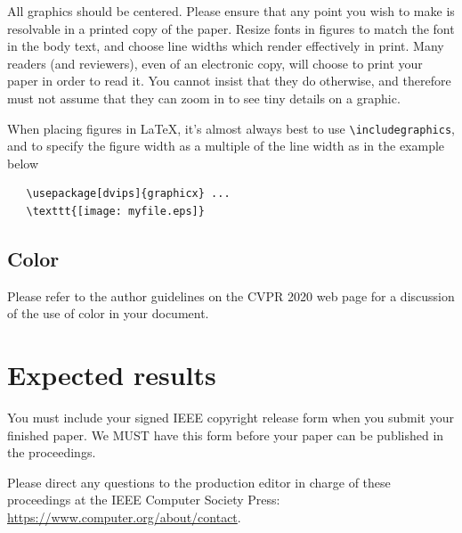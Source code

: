 \documentclass[10pt,twocolumn,letterpaper]{article}
\begin{document}
\begin{CJK}{UTF8}{bkai}
   All graphics should be centered.  Please ensure that any point you wish to
   make is resolvable in a printed copy of the paper.  Resize fonts in figures
   to match the font in the body text, and choose line widths which render
   effectively in print.  Many readers (and reviewers), even of an electronic
   copy, will choose to print your paper in order to read it.  You cannot
   insist that they do otherwise, and therefore must not assume that they can
   zoom in to see tiny details on a graphic.

   When placing figures in \LaTeX, it's almost always best to use
   \verb+\includegraphics+, and to specify the  figure width as a multiple of
   the line width as in the example below
      {\small\begin{verbatim}
   \usepackage[dvips]{graphicx} ...
   \texttt{[image: myfile.eps]}
\end{verbatim}
      }


   \subsection{Color}

   Please refer to the author guidelines on the CVPR 2020 web page for a discussion
   of the use of color in your document.

   \section{Expected results}

   You must include your signed IEEE copyright release form when you submit
   your finished paper. We MUST have this form before your paper can be
   published in the proceedings.

   Please direct any questions to the production editor in charge of these
   proceedings at the IEEE Computer Society Press:
   \url{https://www.computer.org/about/contact}.


   {\small
   
   
   }
\end{CJK}
\end{document}
